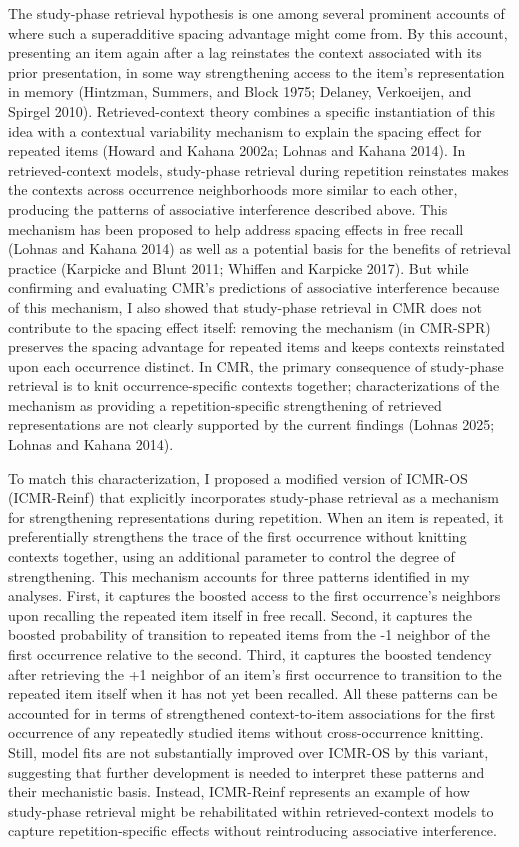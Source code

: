 \documentclass[
  letterpaper,
  11pt,
  english,
  singlespacing,
  headsepline]{MastersDoctoralThesis}
\begin{document}
The study-phase retrieval hypothesis is one among several prominent
accounts of where such a superadditive spacing advantage might come
from. By this account, presenting an item again after a lag reinstates
the context associated with its prior presentation, in some way
strengthening access to the item's representation in memory (Hintzman,
Summers, and Block 1975; Delaney, Verkoeijen, and Spirgel 2010).
Retrieved-context theory combines a specific instantiation of this idea
with a contextual variability mechanism to explain the spacing effect
for repeated items (Howard and Kahana 2002a; Lohnas and Kahana 2014). In
retrieved-context models, study-phase retrieval during repetition
reinstates makes the contexts across occurrence neighborhoods more
similar to each other, producing the patterns of associative
interference described above. This mechanism has been proposed to help
address spacing effects in free recall (Lohnas and Kahana 2014) as well
as a potential basis for the benefits of retrieval practice (Karpicke
and Blunt 2011; Whiffen and Karpicke 2017). But while confirming and
evaluating CMR's predictions of associative interference because of this
mechanism, I also showed that study-phase retrieval in CMR does not
contribute to the spacing effect itself: removing the mechanism (in
CMR-SPR) preserves the spacing advantage for repeated items and keeps
contexts reinstated upon each occurrence distinct. In CMR, the primary
consequence of study-phase retrieval is to knit occurrence-specific
contexts together; characterizations of the mechanism as providing a
repetition-specific strengthening of retrieved representations are not
clearly supported by the current findings (Lohnas 2025; Lohnas and
Kahana 2014).

To match this characterization, I proposed a modified version of ICMR-OS
(ICMR-Reinf) that explicitly incorporates study-phase retrieval as a
mechanism for strengthening representations during repetition. When an
item is repeated, it preferentially strengthens the trace of the first
occurrence without knitting contexts together, using an additional
parameter to control the degree of strengthening. This mechanism
accounts for three patterns identified in my analyses. First, it
captures the boosted access to the first occurrence's neighbors upon
recalling the repeated item itself in free recall. Second, it captures
the boosted probability of transition to repeated items from the -1
neighbor of the first occurrence relative to the second. Third, it
captures the boosted tendency after retrieving the +1 neighbor of an
item's first occurrence to transition to the repeated item itself when
it has not yet been recalled. All these patterns can be accounted for in
terms of strengthened context-to-item associations for the first
occurrence of any repeatedly studied items without cross-occurrence
knitting. Still, model fits are not substantially improved over ICMR-OS
by this variant, suggesting that further development is needed to
interpret these patterns and their mechanistic basis. Instead,
ICMR-Reinf represents an example of how study-phase retrieval might be
rehabilitated within retrieved-context models to capture
repetition-specific effects without reintroducing associative
interference.
\end{document}
